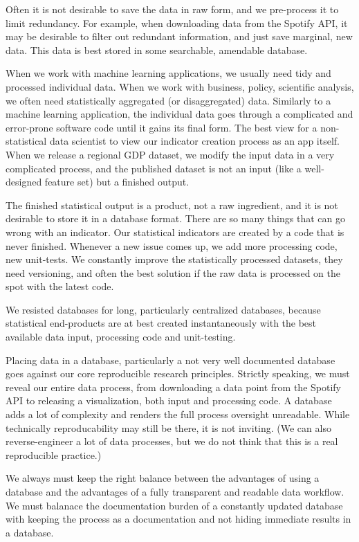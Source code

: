 \documentclass[
  fontsize=13pt,
  english,
  a4paper,
  openany, a4paper, oneside]{book}
\begin{document}
Often it is not desirable to save the data in raw form, and we pre-process it to limit redundancy. For example, when downloading data from the Spotify API, it may be desirable to filter out redundant information, and just save marginal, new data. This data is best stored in some searchable, amendable database.

When we work with machine learning applications, we usually need tidy and processed individual data. When we work with business, policy, scientific analysis, we often need statistically aggregated (or disaggregated) data. Similarly to a machine learning application, the individual data goes through a complicated and error-prone software code until it gains its final form. The best view for a non-statistical data scientist to view our indicator creation process as an app itself. When we release a regional GDP dataset, we modify the input data in a very complicated process, and the published dataset is not an input (like a well-designed feature set) but a finished output.

The finished statistical output is a product, not a raw ingredient, and it is not desirable to store it in a database format. There are so many things that can go wrong with an indicator. Our statistical indicators are created by a code that is never finished. Whenever a new issue comes up, we add more processing code, new unit-tests. We constantly improve the statistically processed datasets, they need versioning, and often the best solution if the raw data is processed on the spot with the latest code.

We resisted databases for long, particularly centralized databases, because statistical end-products are at best created instantaneously with the best available data input, processing code and unit-testing.

Placing data in a database, particularly a not very well documented database goes against our core reproducible research principles. Strictly speaking, we must reveal our entire data process, from downloading a data point from the Spotify API to releasing a visualization, both input and processing code. A database adds a lot of complexity and renders the full process oversight unreadable. While technically reproducability may still be there, it is not inviting. (We can also reverse-engineer a lot of data processes, but we do not think that this is a real reproducible practice.)

We always must keep the right balance between the advantages of using a database and the advantages of a fully transparent and readable data workflow. We must balanace the documentation burden of a constantly updated database with keeping the process as a documentation and not hiding immediate results in a database.
\end{document}
